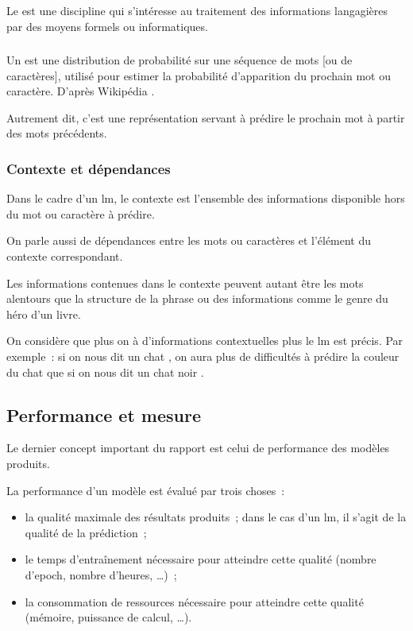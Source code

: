 \subsubsection{} \label{subsec:nlp}\label{def:nlp}
Le  est une discipline qui s'intéresse au traitement des informations langagières par des moyens formels ou informatiques.

\subsubsection{}
Un  est une \og distribution de probabilité sur une séquence de mots [ou de caractères]\fg{}, 
utilisé pour estimer la probabilité d'apparition du prochain mot ou caractère. D'après Wikipédia \autocite{wiki_lm}.

Autrement dit, c'est une représentation servant à prédire le prochain mot à partir des mots précédents.

\subsubsection{Contexte et dépendances}
Dans le cadre d'un \gls{lm}, le contexte est l'ensemble des informations disponible hors du mot ou caractère à prédire.

On parle aussi de dépendances entre les mots ou caractères et l'élément du contexte correspondant.

Les informations contenues dans le contexte peuvent autant être les mots alentours que la structure de la phrase ou des informations comme le genre du héro d'un livre.

On considère que plus on à d'informations contextuelles plus le \gls{lm} est précis. Par exemple~: si on nous dit \og un chat \fg{}, on aura plus de difficultés à prédire la couleur du chat que si on nous dit \og un chat noir \fg{}.

\subsection{Performance et mesure}
Le dernier concept important du rapport est celui de performance des modèles produits.

La performance d'un modèle est évalué par trois choses~:
\begin{itemize}
	\item la qualité maximale des résultats produits~; dans le cas d'un \gls{lm}, il s'agit de la qualité de la prédiction~;
	\item le temps d'entraînement nécessaire pour atteindre cette qualité (nombre d'\gls{epoch}, nombre d'heures, \dots)~;
	\item la consommation de ressources nécessaire pour atteindre cette qualité (mémoire, puissance de calcul, \dots).
\end{itemize}
\vspace{1em}

